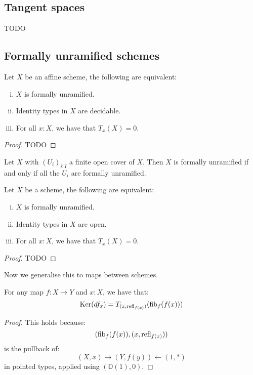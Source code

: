 \subsection{Tangent spaces}

TODO


\subsection{Formally unramified schemes}

\begin{lemma}
Let $X$ be an affine scheme, the following are equivalent:
\begin{enumerate}[(i)]
\item $X$ is formally unramified.
\item Identity types in $X$ are decidable.
\item For all $x:X$, we have that $T_x(X)=0$.
\end{enumerate}
\end{lemma}

\begin{proof}
TODO
\end{proof}

\begin{lemma}
Let $X$ with $(U_i)_{i:I}$ a finite open cover of $X$. Then $X$ is formally unramified if and only if all the $U_i$ are formally unramified.
\end{lemma}

\begin{corollary}
Let $X$ be a scheme, the following are equivalent:
\begin{enumerate}[(i)]
\item $X$ is formally unramified.
\item Identity types in $X$ are open.
\item For all $x:X$, we have that $T_x(X)=0$.
\end{enumerate}
\end{corollary}

\begin{proof}
TODO
\end{proof}

Now we generalise this to maps between schemes.

\begin{lemma}
\label{kernel-is-tangent-of-fibers}
For any map $f:X\to Y$ and $x:X$, we have that:
\[
\mathrm{Ker}(df_x) = T_{(x,\mathrm{refl}_{f(x)})}(\mathrm{fib}_f(f(x)))
\]
\end{lemma}
\begin{proof}
This holds because:
\[
(\mathrm{fib}_f(f(x)),(x,\mathrm{refl}_{f(x)}))
\]
is the pullback of:
\[
(X,x) \to (Y,f(y)) \leftarrow (1,*)
\]
in pointed types, applied using $(\mathbb{D}(1),0)$.
\end{proof}

